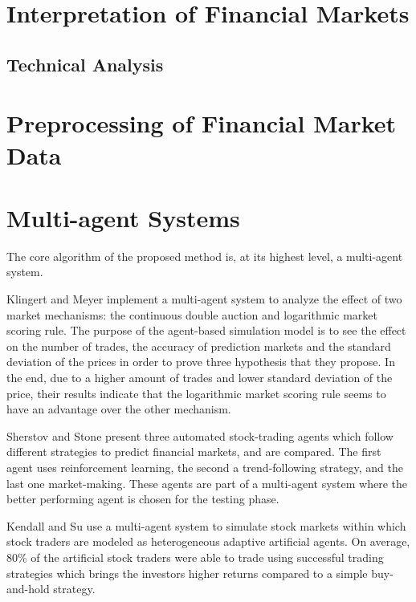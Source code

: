 \section{Interpretation of Financial Markets}
\label{section:interpretation-of-financial-markets}

\subsection{Technical Analysis}
\label{section:technical-analysis}

\section{Preprocessing of Financial Market Data}
\label{section:preprocessing-of-financial-market-data}

\section{Multi-agent Systems}
\label{section:multi-agent-systems}

The core algorithm of the proposed method is, at its highest level, a
multi-agent system.

Klingert and Meyer \cite{Klingert_2012} implement a multi-agent system to analyze the effect of
two market mechanisms: the continuous double auction and logarithmic market
scoring rule. The purpose of the agent-based simulation model is to see the
effect on the number of trades, the accuracy of prediction markets and the
standard deviation of the prices in order to prove three hypothesis that they
propose. In the end, due to a higher amount of trades and lower standard
deviation of the price, their results indicate that the logarithmic market
scoring rule seems to have an advantage over the other mechanism.

Sherstov and Stone \cite{Sherstov2005} present three automated stock-trading
agents which follow different strategies to predict financial markets, and are
compared. The first agent uses reinforcement learning, the second a
trend-following strategy, and the last one market-making. These agents are part
of a multi-agent system where the better performing agent is chosen for the testing phase.

Kendall and Su \cite{Kendall2003} use a multi-agent system to simulate stock markets within
which stock traders are modeled as heterogeneous adaptive artificial agents. On
average, 80\% of the artificial stock traders were able to trade using
successful trading strategies which brings the investors higher returns compared
to a simple buy-and-hold strategy.


